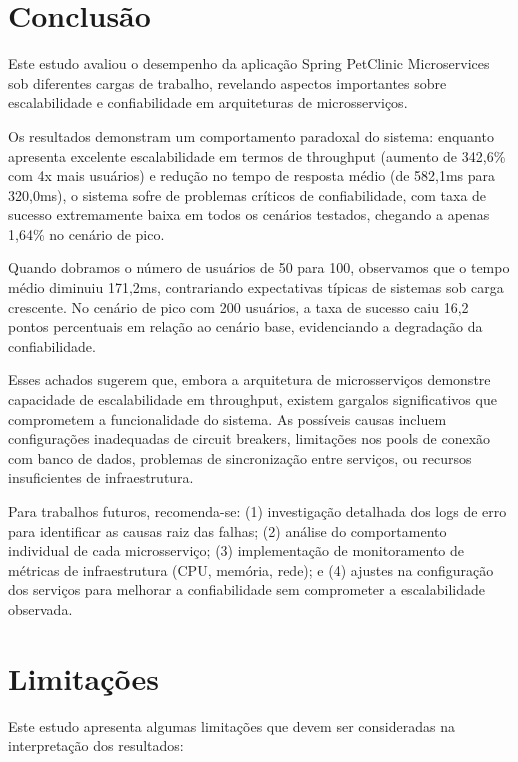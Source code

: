 \documentclass[conference]{IEEEtran}
\begin{document}
    \section{Conclusão}

    Este estudo avaliou o desempenho da aplicação Spring PetClinic Microservices
    sob diferentes cargas de trabalho, revelando aspectos importantes sobre escalabilidade
    e confiabilidade em arquiteturas de microsserviços.

    Os resultados demonstram um comportamento paradoxal do sistema: enquanto
    apresenta excelente escalabilidade em termos de throughput (aumento de 342,6\%
    com 4x mais usuários) e redução no tempo de resposta médio (de 582,1ms para
    320,0ms), o sistema sofre de problemas críticos de confiabilidade, com taxa de
    sucesso extremamente baixa em todos os cenários testados, chegando a apenas
    1,64\% no cenário de pico.

    Quando dobramos o número de usuários de 50 para 100, observamos que o tempo
    médio diminuiu 171,2ms, contrariando expectativas típicas de sistemas sob carga
    crescente. No cenário de pico com 200 usuários, a taxa de sucesso caiu 16,2 pontos
    percentuais em relação ao cenário base, evidenciando a degradação da
    confiabilidade.

    Esses achados sugerem que, embora a arquitetura de microsserviços demonstre capacidade
    de escalabilidade em throughput, existem gargalos significativos que
    comprometem a funcionalidade do sistema. As possíveis causas incluem configurações
    inadequadas de circuit breakers, limitações nos pools de conexão com banco
    de dados, problemas de sincronização entre serviços, ou recursos
    insuficientes de infraestrutura.

    Para trabalhos futuros, recomenda-se: (1) investigação detalhada dos logs de
    erro para identificar as causas raiz das falhas; (2) análise do comportamento
    individual de cada microsserviço; (3) implementação de monitoramento de
    métricas de infraestrutura (CPU, memória, rede); e (4) ajustes na configuração
    dos serviços para melhorar a confiabilidade sem comprometer a escalabilidade
    observada.

    \section{Limitações}

    Este estudo apresenta algumas limitações que devem ser consideradas na
    interpretação dos resultados:
\end{document}
